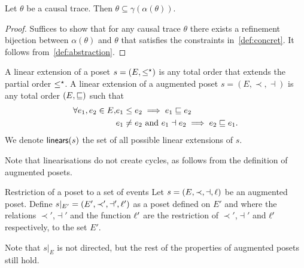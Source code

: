 \begin{theorem}
  Let $\theta$ be a causal trace. Then $\theta\subseteq\gamma(\alpha(\theta))$.
\end{theorem}
\begin{proof}
  Suffices to show that for any causal trace $\theta$ there exists a refinement bijection between $\alpha(\theta)$ and $\theta$ that satisfies the constraints in~\autoref{def:concret}. It follows from~\autoref{def:abstraction}.
\end{proof}


\begin{definition}
  \label{def:linears}
  A linear extension of a poset $s=(E,\leq^{\star})$ is any total order that extends the partial order $\leq^{\star}$.
  A linear extension of a augmented poset $s=(E,\prec,\dashv)$ is any total order $(E,\sqsubseteq)$ such that
  \begin{align*}
    \forall e_1,e_2\in E, &e_1\leq e_2\implies e_1\sqsubseteq e_2\\
    & e_1\neq e_2\text{ and }e_1\dashv e_2\implies e_2\sqsubseteq e_1.
  \end{align*}
  We denote $\mathsf{linears}(s)$ the set of all possible linear extensions of $s$.
\end{definition}
Note that linearisations do not create cycles, as follows from the definition of augmented posets.

\begin{definition}{Restriction of a poset to a set of events}
  Let $s=(E,\prec,\dashv,\ell)$ be an augmented poset.
  Define $s|_{E'}=(E',\prec',\dashv',\ell')$ as a poset defined on $E'$ and where the relations $\prec'$,$\dashv'$ and the function $\ell'$ are the restriction of $\prec'$,$\dashv'$ and $\ell'$ respectively, to the set $E'$.
\end{definition}

Note that $s|_E$ is not directed, but the rest of the properties of augmented posets still hold.


